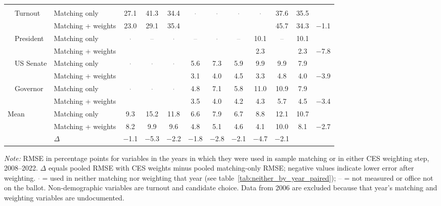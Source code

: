 \begin{table}[!htbp]
{\begin{threeparttable}
\begin{tabular}{llcccccccccc}
\addlinespace[0.3em]
\multicolumn{12}{l}{Non-demographic} \\
\addlinespace[0.1em]
~~Turnout & Matching only & 27.1 & 41.3 & 34.4 & \textcolor{gray}{$\cdot$} & \textcolor{gray}{$\cdot$} & \textcolor{gray}{$\cdot$} & \textcolor{gray}{$\cdot$} & 37.6 & 35.5 & \\
 & Matching + weights & 23.0 & 29.1 & 35.4 &  &  &  &  & 45.7 & 34.3 & $-$1.1 \\
\addlinespace[0.1em]
~~President & Matching only & \textcolor{gray}{$\cdot$} & \textcolor{gray}{--} & \textcolor{gray}{$\cdot$} & \textcolor{gray}{--} & \textcolor{gray}{$\cdot$} & \textcolor{gray}{--} & 10.1 & \textcolor{gray}{--} & 10.1 & \\
 & Matching + weights &  &  &  &  &  &  & 2.3 &  & 2.3 & $-$7.8 \\
\addlinespace[0.1em]
~~US Senate & Matching only & \textcolor{gray}{$\cdot$} & \textcolor{gray}{$\cdot$} & \textcolor{gray}{$\cdot$} & 5.6 & 7.3 & 5.9 & 9.9 & 9.9 & 7.9 & \\
 & Matching + weights &  &  &  & 3.1 & 4.0 & 4.5 & 3.3 & 4.8 & 4.0 & $-$3.9 \\
\addlinespace[0.1em]
~~Governor & Matching only & \textcolor{gray}{$\cdot$} & \textcolor{gray}{$\cdot$} & \textcolor{gray}{$\cdot$} & 4.8 & 7.1 & 5.8 & 11.0 & 10.9 & 7.9 & \\
 & Matching + weights &  &  &  & 3.5 & 4.0 & 4.2 & 4.3 & 5.7 & 4.5 & $-$3.4 \\
\midrule
Mean\tnote{b} & Matching only & 9.3 & 15.2 & 11.8 & 6.6 & 7.9 & 6.7 & 8.8 & 12.1 & 10.7 & \\
 & Matching + weights & 8.2 & 9.9 & 9.6 & 4.8 & 5.1 & 4.6 & 4.1 & 10.0 & 8.1 & $-$2.7 \\
 & $\Delta$ & $-$1.1 & $-$5.3 & $-$2.2 & $-$1.8 & $-$2.8 & $-$2.1 & $-$4.7 & $-$2.1 & & \\
\bottomrule
\end{tabular}
\begin{tablenotes}
\footnotesize
\item \textit{Note:} RMSE in percentage points for variables in the years in which they were used in sample matching or in either CES weighting step, 2008--2022. $\Delta$ equals pooled RMSE with CES weights minus pooled matching-only RMSE; negative values indicate lower error after weighting. \textcolor{gray}{$\cdot$} = used in neither matching nor weighting that year (see table~\ref{tab:neither_by_year_paired}); \textcolor{gray}{--} = not measured or office not on the ballot. Non-demographic variables are turnout and candidate choice. Data from 2006 are excluded because that year's matching and weighting variables are undocumented.

\end{tablenotes}
\end{threeparttable}}
\end{table}
